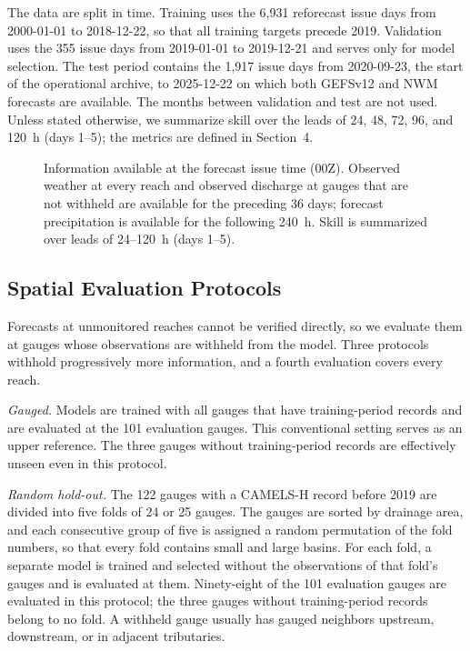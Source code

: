 The data are split in time. Training uses the 6,931 reforecast issue days from 2000-01-01 to 2018-12-22, so that all training targets precede 2019. Validation uses the 355 issue days from 2019-01-01 to 2019-12-21 and serves only for model selection. The test period contains the 1,917 issue days from 2020-09-23, the start of the operational archive, to 2025-12-22 on which both GEFSv12 and NWM forecasts are available. The months between validation and test are not used. Unless stated otherwise, we summarize skill over the leads of 24, 48, 72, 96, and 120~h (days 1--5); the metrics are defined in Section~4.

\begin{figure}
\caption{Information available at the forecast issue time (00Z). Observed weather at every reach and observed discharge at gauges that are not withheld are available for the preceding 36 days; forecast precipitation is available for the following 240~h. Skill is summarized over leads of 24--120~h (days 1--5).}
\label{fig:protocol}
\end{figure}

\subsection{Spatial Evaluation Protocols}
\label{sec:holdout}
Forecasts at unmonitored reaches cannot be verified directly, so we evaluate them at gauges whose observations are withheld from the model. Three protocols withhold progressively more information, and a fourth evaluation covers every reach.

\textit{Gauged.} Models are trained with all gauges that have training-period records and are evaluated at the 101 evaluation gauges. This conventional setting serves as an upper reference. The three gauges without training-period records are effectively unseen even in this protocol.

\textit{Random hold-out.} The 122 gauges with a CAMELS-H record before 2019 are divided into five folds of 24 or 25 gauges. The gauges are sorted by drainage area, and each consecutive group of five is assigned a random permutation of the fold numbers, so that every fold contains small and large basins. For each fold, a separate model is trained and selected without the observations of that fold's gauges and is evaluated at them. Ninety-eight of the 101 evaluation gauges are evaluated in this protocol; the three gauges without training-period records belong to no fold. A withheld gauge usually has gauged neighbors upstream, downstream, or in adjacent tributaries.

